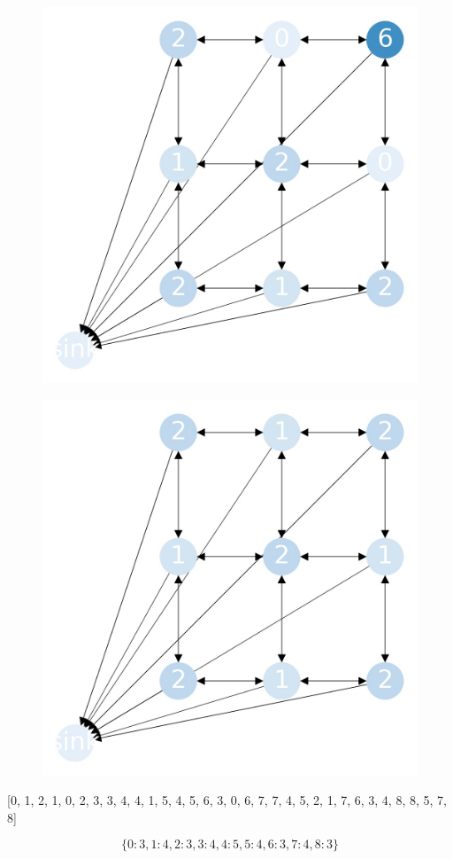 \documentclass{beamer}
\begin{document}
\begin{frame}
  \begin{figure}[h!]
    \centering
      \includegraphics[scale=0.25]{sandpile_32}
  \end{figure}
\end{frame}


\begin{frame}
  \begin{figure}[h!]
    \centering
      \includegraphics[scale=0.25]{sandpile_33}
  \end{figure}
\end{frame}


\begin{frame}

[0, 1, 2, 1, 0, 2, 3, 3, 4, 4, 1, 5, 4, 5, 6, 3, 0, 6, 7, 7, 4, 5, 2, 1, 7, 6, 3, 4, 8, 8, 5, 7, 8]

\[
\{{0: 3, 1: 4, 2: 3, 3: 4, 4: 5, 5: 4, 6: 3, 7: 4, 8: 3}\}
\]
\end{frame}
\end{document}
